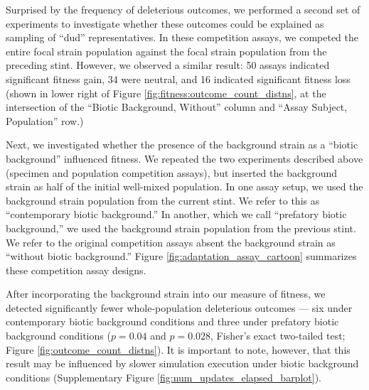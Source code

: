 Surprised by the frequency of deleterious outcomes, we performed a second set of experiments to investigate whether these outcomes could be explained as sampling of ``dud'' representatives.
In these competition assays, we competed the entire focal strain population against the focal strain population from the preceding stint.
However, we observed a similar result: 50 assays indicated significant fitness gain, 34 were neutral, and 16 indicated significant fitness loss (shown in lower right of Figure \ref{fig:fitness:outcome_count_distns}, at the intersection of the ``Biotic Background, Without'' column and ``Assay Subject, Population'' row.)



Next, we investigated whether the presence of the background strain as a ``biotic background'' influenced fitness.
We repeated the two experiments described above (specimen and population competition assays), but inserted the background strain as half of the initial well-mixed population.
In one assay setup, we used the background strain population from the current stint.
We refer to this as ``contemporary biotic background.''
In another, which we call ``prefatory biotic background,'' we used the background strain population from the previous stint.
We refer to the original competition assays absent the background strain as ``without biotic background.''
Figure \ref{fig:adaptation_assay_cartoon} summarizes these competition assay designs.



After incorporating the background strain into our measure of fitness, we detected significantly fewer whole-population deleterious outcomes --- six under contemporary biotic background conditions and three under prefatory biotic background conditions ($p = 0.04$ and $p = 0.028$, Fisher's exact two-tailed test; Figure \ref{fig:outcome_count_distns}).
It is important to note, however, that this result may be influenced by slower simulation execution under biotic background conditions (Supplementary Figure \ref{fig:num_updates_elapsed_barplot}).

